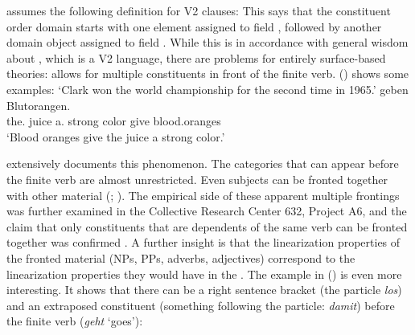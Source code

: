 \documentclass[output=paper,biblatex,babelshorthands,newtxmath,draftmode,colorlinks,citecolor=brown]{langscibook}
\begin{document}
\citet[]{Kathol2001a} assumes the following definition for V2 clauses:
\ea
{} \impl
{}
\z
This says that the constituent order domain starts with one element assigned to field ,
followed by another domain object assigned to field . While this is in accordance with
general wisdom about , which is a V2 language, there are problems for entirely surface-based
theories:  allows for multiple constituents in front of the finite verb. () shows some
examples:
\eal
\label{ex-mult-front}
\ex
{}
\label{bsp-zum-zweiten-mal-die-Weltmeisterschaft}
\glt `Clark won the world championship for the second time in 1965.'
\ex
\label{ex-dem-saft-eine-kraeftige-farbe}
 geben Blutorangen.\footnotemark\\
     \spacebr{}the.\DAT{} juice \spacebr{}a.\ACC{}   strong   color give blood.oranges\\
\glt `Blood oranges give the juice a strong color.'

\zl 
\citet{Mueller2003b} extensively documents this phenomenon. The categories that can appear
before the finite verb are almost unrestricted. Even subjects can be fronted together with other
material (\citealp[]{BC2010a}; \citealp[]{Bildhauer2011a}). The empirical side of
these apparent multiple frontings was further examined in the Collective Research Center 632,
Project A6, and the claim that only constituents that are dependents of the same verb can be fronted
together \parencites[]{Fanselow93a}[]{Hoberg97a} was confirmed
\citep[Chapter~3]{MuellerGS}. A further insight is that the linearization properties of the fronted
material (NPs, PPs, adverbs, adjectives) correspond to the linearization properties they would have
in the \mf. The example in () is even more interesting. It shows that there can be a right
sentence bracket (the particle \emph{los}) and an extraposed constituent (something following the
particle: \emph{damit}) before the finite verb (\emph{geht} `goes'):
\end{document}
